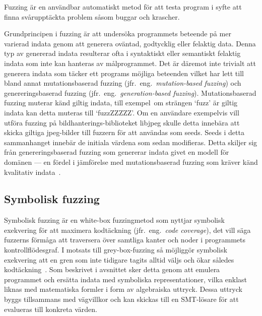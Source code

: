 Fuzzing är en användbar automatiskt metod för att testa program i syfte att finna
svårupptäckta problem såsom buggar och krascher.

Grundprincipen i fuzzing är att undersöka programmets beteende på mer varierad
indata genom att generera oväntad, godtycklig eller felaktig data. Denna typ av
genererad indata resulterar ofta i syntaktiskt eller semantiskt felaktig indata
som inte kan hanteras av målprogrammet. Det är däremot inte trivialt att
generera indata som täcker ett programs möjliga beteenden vilket har lett till
bland annat mutationsbaserad fuzzing (jfr.\ eng.\ \emph{mutation-based fuzzing})
och genereringsbaserad fuzzing (jfr.\ eng.\ \emph{generation-based fuzzing}).
Mutationsbaserad fuzzing muterar känd giltig indata, till exempel\ om strängen
`fuzz' är giltig indata kan detta muteras till `fuzzZZZZZ'. Om en användare
exempelvis vill utföra fuzzing på bildhanterings-biblioteket libjpeg skulle
detta innebära att skicka giltiga jpeg-bilder till fuzzern för att användas som
seeds. Seeds i detta sammanhanget innebär de initiala värdena som sedan
modifieras. Detta skiljer sig från genereringsbaserad fuzzing som genererar
indata givet en modell för domänen --- en fördel i jämförelse med
mutationsbaserad fuzzing som kräver känd kvalitativ indata~\cite{fuzzing}.

\subsection{Symbolisk fuzzing} Symbolisk fuzzing är en white-box fuzzingmetod
som nyttjar symbolisk exekvering för att maximera kodtäckning (jfr.\ eng.\ \emph{code coverage}), det vill säga fuzzerns
förmåga att traversera över samtliga kanter och noder i programmets kontrollflödesgraf.
I motsats till grey-box-fuzzing så möjliggör symbolisk exekvering att en gren som inte tidigare tagits alltid väljs
och ökar således kodtäckning~\cite{challenges_fuzzing}. Som beskrivet i avsnittet 
sker detta genom att emulera programmet och ersätta indata med symboliska representationer, vilka enklast liknas med
matematiska formler i form av algebraiska uttryck. Dessa uttryck byggs tillsammans med vägvillkor
och kan skickas till en SMT-lösare för att evalueras till konkreta värden.

